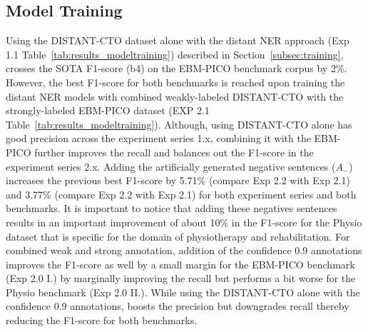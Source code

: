 \documentclass[letterpaper]{article} %
\begin{document}
\subsection{Model Training}
\label{subsec:res_mod}
%
Using the DISTANT-CTO dataset alone with the distant NER approach (Exp 1.1 Table~\ref{tab:results_modeltraining}) described in Section~\ref{subsec:training}, crosses the SOTA F1-score (b4) on the EBM-PICO benchmark corpus by 2\%.
However, the best F1-score for both benchmarks is reached upon training the distant NER models with combined weakly-labeled DISTANT-CTO with the strongly-labeled EBM-PICO dataset (EXP 2.1 Table~\ref{tab:results_modeltraining}).
Although, using DISTANT-CTO alone has good precision across the experiment series 1.x, combining it with the EBM-PICO further improves the recall and balances out the F1-score in the experiment series 2.x.
Adding the artificially generated negative sentences ($A_{-}$) increases the previous best F1-score by 5.71\% (compare Exp 2.2 with Exp 2.1) and 3.77\% (compare Exp 2.2 with Exp 2.1) for both experiment series and both benchmarks.
It is important to notice that adding these negatives sentences results in an important improvement of about 10\% in the F1-score for the Physio dataset that is specific for the domain of physiotherapy and rehabilitation.
For combined weak and strong annotation, addition of the confidence 0.9 annotations improves the F1-score as well by a small margin for the EBM-PICO benchmark (Exp 2.0 I.) by marginally improving the recall but performs a bit worse for the Physio benchmark (Exp 2.0 II.).
While using the DISTANT-CTO alone with the confidence 0.9 annotations, boosts the precision but downgrades recall thereby reducing the F1-score for both benchmarks.
%
%
%
\end{document}
